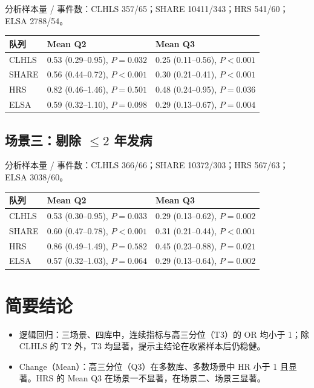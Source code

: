 \documentclass[11pt,a4paper]{article}
\begin{document}
{\footnotesize 分析样本量 / 事件数：CLHLS 357/65；SHARE 10411/343；HRS 541/60；ELSA 2788/54。}

\begin{center}\footnotesize
\begin{tabular}{lp{6.8cm}p{6.8cm}}
\toprule
队列 & Mean Q2 & Mean Q3 \\
\midrule
CLHLS & 0.53 (0.29--0.95), $P{=}0.032$ & 0.25 (0.11--0.56), $P{<}0.001$ \\
SHARE & 0.56 (0.44--0.72), $P{<}0.001$ & 0.30 (0.21--0.41), $P{<}0.001$ \\
HRS & 0.82 (0.46--1.46), $P{=}0.501$ & 0.48 (0.24--0.95), $P{=}0.036$ \\
ELSA & 0.59 (0.32--1.10), $P{=}0.098$ & 0.29 (0.13--0.67), $P{=}0.004$ \\
\bottomrule
\end{tabular}
\end{center}

\subsection{场景三：剔除 $\le 2$ 年发病}

{\footnotesize 分析样本量 / 事件数：CLHLS 366/66；SHARE 10372/303；HRS 567/63；ELSA 3038/60。}

\begin{center}\footnotesize
\begin{tabular}{lp{6.8cm}p{6.8cm}}
\toprule
队列 & Mean Q2 & Mean Q3 \\
\midrule
CLHLS & 0.53 (0.30--0.95), $P{=}0.033$ & 0.29 (0.13--0.62), $P{=}0.002$ \\
SHARE & 0.60 (0.47--0.78), $P{<}0.001$ & 0.31 (0.21--0.44), $P{<}0.001$ \\
HRS & 0.86 (0.49--1.49), $P{=}0.582$ & 0.45 (0.23--0.88), $P{=}0.021$ \\
ELSA & 0.57 (0.32--1.03), $P{=}0.064$ & 0.29 (0.13--0.64), $P{=}0.002$ \\
\bottomrule
\end{tabular}
\end{center}

\section{简要结论}

\begin{itemize}[leftmargin=1.4em]
  \item 逻辑回归：三场景、四库中，连续指标与高三分位（T3）的 OR 均小于 1；除 CLHLS 的 T2 外，T3 均显著，提示主结论在收紧样本后仍稳健。
  \item Change（Mean）：高三分位（Q3）在多数库、多数场景中 HR 小于 1 且显著。HRS 的 Mean Q3 在场景一不显著，在场景二、场景三显著。
\end{itemize}
\end{document}
